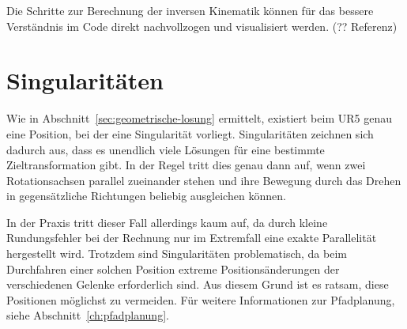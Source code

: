 Die Schritte zur Berechnung der inversen Kinematik können für das bessere Verständnis im Code direkt nachvollzogen und visualisiert werden. (?? Referenz)


\section{Singularitäten}\label{sec:singularitaten}

Wie in Abschnitt~\ref{sec:geometrische-losung} ermittelt, existiert beim UR5 genau eine Position, bei der eine Singularität vorliegt.
Singularitäten zeichnen sich dadurch aus, dass es unendlich viele Lösungen für eine bestimmte Zieltransformation gibt.
In der Regel tritt dies genau dann auf, wenn zwei Rotationsachsen parallel zueinander stehen und ihre Bewegung durch das Drehen in gegensätzliche Richtungen beliebig ausgleichen können.

In der Praxis tritt dieser Fall allerdings kaum auf, da durch kleine Rundungsfehler bei der Rechnung nur im Extremfall eine exakte Parallelität hergestellt wird.
Trotzdem sind Singularitäten problematisch, da beim Durchfahren einer solchen Position extreme Positionsänderungen der verschiedenen Gelenke erforderlich sind.
Aus diesem Grund ist es ratsam, diese Positionen möglichst zu vermeiden.
Für weitere Informationen zur Pfadplanung, siehe Abschnitt~\ref{ch:pfadplanung}.
